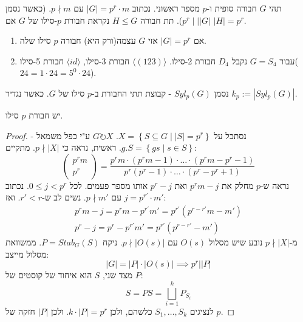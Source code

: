 \documentclass{tstextbook}
\begin{document}
\begin{definition}
תהי \(G\) חבורה סופית ו-\(p\) מספר ראשוני. נכתוב \(|G|=p^r\cdot m\) עם \(p\nmid m\). (כאשר נסמן \(p^r \mid \mid |G|\)). תת חבורה \(H\leq G\) נקראת חבורת \(p\)-סילו של \(G\) אם \(|H|=p^r\).

\end{definition}
\begin{example}
  \begin{enumerate}
    \item אם \(|G|=p^r\) אזי \(G\) עצמה(ורק היא) חבורה \(p\) סילו שלה. 


    \item עבור \(G=S_{4}\) נקבל \(D_{4}\) חבורת 2-סילו. \(\langle (123)\rangle\) חבורת 3-סילו, \(\langle id\rangle\) חבורת 5-סילו(\(24=1\cdot 24=5^0\cdot 24\)). 


  \end{enumerate}
\end{example}
\begin{symbolize}
נסמן \(Syl_{p}(G)\) - קבוצת תתי החבורת ב-\(p\) סילו של \(G\). כאשר נגדיר \(k_{p}:=|Syl_{p}(G)|\).

\end{symbolize}
\begin{theorem}[סילו 1]
יש חבורת \(p\) סילו.

\end{theorem}
\begin{proof}
נסתכל על \(X=\left\{  S\subseteq G  \mid |S|=p^r\right\}\). \(G\circlearrowright X\) ע"י כפל משמאל -\(g.S=\left\{  gs\mid s\in S  \right\}\). ראשית, נראה כי \(p\nmid |X|\).
מתקיים: 
$$\begin{pmatrix}p^r m\\p^r 
\end{pmatrix}=\frac{p^r m\cdot  (p^r m - 1) \cdot \dots\cdot (p^r m - p^r - 1)}{p^r (p^r-1)\cdot \dots\cdot (p^r-p^r+1)}$$
נראה ש-\(p\) מחלק את \(p^r m - j\) ואת \(p^r - j\) אותו מספר פעמים. לכל \(0\leq j<p^r\). נכתוב \(j=p^{r'}\cdot m'\) עם \(p\nmid m'\). נשים לב ש-\(r'<r\). ואז: 
$$\begin{gathered}p^r m -j = p^r m - p^{r'}m' = p^{r'}(p^{r-r'}m-m') \\p^r - j = p^r - p^{r'}m'=p^{r'}(p^{r-r'}-m')
\end{gathered}$$
מ-\(p \nmid|X|\) נובע שיש מסלול \(O(s)\) עם \(p \nmid |O(s)|\). ניקח \(P=Stab_{G}(S)\). ממשוואת מסלול מייצב:
$$|G|=|P|\cdot |O(s)|\implies p^r ||P|$$
מצד שני, \(S\) הוא איחוד של קוסטים של \(P\): 
$$S=PS=\bigsqcup_{i=1}^k P_{S_{i}}$$
לנציגים \(S_{1},\dots,S_{k}\) כלשהם, ולכן \(k\cdot |P|=p^r\). ולכן \(|P|\) חזקה של \(p\).

\end{proof}
\end{document}
